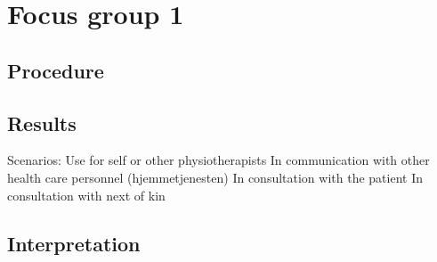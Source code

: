 \chapter{Focus group 1}

\section{Procedure}

\section{Results}
Scenarios:
Use for self or other physiotherapists
In communication with other health care personnel (hjemmetjenesten)
In consultation with the patient
In consultation with next of kin 

\section{Interpretation}

